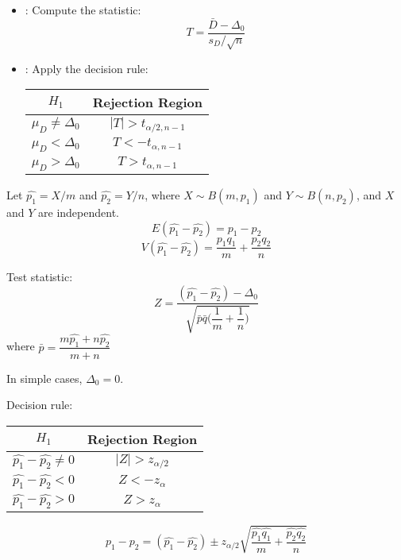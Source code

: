 \begin{multicols}{3}
    \begin{itemize}
      \item {}: Compute the statistic:
        \[
          T = \frac{\bar{D} - \Delta_0}{s_{D} / \sqrt{n}}
        \]
      \item {}: Apply the decision rule:
      \begin{center}
      \begin{tabular}{|c|c|}
        \hline
        \textbf{$H_1$}              & \textbf{Rejection Region} \\ \hline
        $\mu_D \neq \Delta_0$ & $|T| > t_{\alpha/2, n - 1}$ \\ \hline
        $\mu_D < \Delta_0$    & $T < -t_{\alpha, n - 1}$    \\ \hline
        $\mu_D > \Delta_0$    & $T > t_{\alpha, n - 1}$     \\ \hline
        \end{tabular}
      \end{center}
    \end{itemize}

      \par Let $\hat{p_1} = X/m$ and $\hat{p_2} = Y/n$, where $X \sim B(m, p_1)$ and $Y \sim B(n, p_2)$, and $X$ and $Y$ are independent.
        \[
          E(\hat{p_1} - \hat{p_2}) = p_1 - p_2
        \]
        \[
          V(\hat{p_1} - \hat{p_2}) = \frac{p_1 q_1}{m} + \frac{p_2 q_2}{n}
        \]
    
      \par Test statistic:
        \[
          Z = \frac{(\hat{p_1} - \hat{p_2}) - \Delta_0}
          {\sqrt{\bar{p}\bar{q} \bigg(\dfrac{1}{m} + \dfrac{1}{n} \bigg)}}
        \]
      where $\bar{p} = \dfrac{m\hat{p_1} + n\hat{p_2}}{m + n}$
      \par In simple cases, $\Delta_0 = 0$.
      \par Decision rule:
      \begin{center}
        \begin{tabular}{|c|c|}
          \hline
          \textbf{$H_1$}                 & \textbf{Rejection Region} \\ \hline
          $\hat{p_1} - \hat{p_2} \neq 0$ & $|Z| > z_{\alpha/2}$ \\ \hline
          $\hat{p_1} - \hat{p_2} < 0$    & $Z < -z_{\alpha}$    \\ \hline
          $\hat{p_1} - \hat{p_2} > 0$    & $Z > z_{\alpha}$     \\ \hline
          \end{tabular}
        \end{center}

      \[
        p_1 - p_2 = (\hat{p_1} - \hat{p_2}) \pm z_{\alpha / 2} \sqrt{\frac{\hat{p_1}\hat{q_1}}{m} + \frac{\hat{p_2}\hat{q_2}}{n}}
      \]
\end{multicols}
